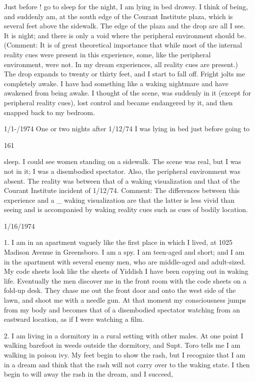 \documentclass[10pt,twoside]{memoir}
\begin{document}
\begin{enumerate}
{Just before ! go to sleep for the night, I am lying in bed drowsy. I think 
of being, and suddenly am, at the south edge of the Courant Institute plaza, 
which is several feet above the sidewalk. The edge of the plaza and the drop 
are all I see. It is night; and there is only a void where the peripheral 
environment should be. (Comment: It is of great theoretical importance that 
while most of the internal reality cues were present in this experience, some, 
like the peripheral environment, were not. In my dream experiences, all 
reality cues are present.) The drop expands to twenty or thirty feet, and I 
start to fall off. Fright jolts me completely awake. I have had something like 
a waking nightmare and have awakened from being awake. I thought of the 
scene, was suddenly in it (except for peripheral reality cues), lost control and 
became endangered by it, and then snapped back to my bedroom. 


1/1-/1974 
One or two nights after 1/12/74 I was lying in bed just before going to 


161 


sleep. I could see women standing on a sidewalk. The scene was real, but I 
was not in it; I was a disembodied spectator. Also, the peripheral 
environment was absent. The reality was between that of a waking 
visualization and that of the Courant Institute incident of 1/12/74. 
Comment: The differences between this experience and a _ waking 
visualization are that the latter is less vivid than seeing and is accompanied 
by waking reality cues such as cues of bodily location. 


1/16/1974 

1. I am in an apartment vaguely like the first place in which I lived, at 
1025 Madison Avenue in Greensboro. I am a spy. I am teen-aged and short; 
and I am in the apartment with several enemy men, who are middle-aged and 
adult-sized. My code sheets look like the sheets of Yiddish I have been 
copying out in waking life. Eventually the men discover me in the front 
room with the code sheets on a fold-up desk. They chase me out the front 
door and onto the west side of the lawn, and shoot me with a needle gun. At 
that moment my consciousness jumps from my body and becomes that of a 
disembodied spectator watching from an eastward location, as if I were 
watching a film. 

2. I am living in a dormitory in a rural setting with other males. At one 
point I walking barefoot in weeds outside the dormitory, and Supt. Toro 
tells me I am walking in poison ivy. My feet begin to show the rash, but I 
recognize that I am in a dream and think that the rash will not carry over to 
the waking state. I then begin to will away the rash in the dream, and I 
succeed, 


}
\end{enumerate}
\end{document}
